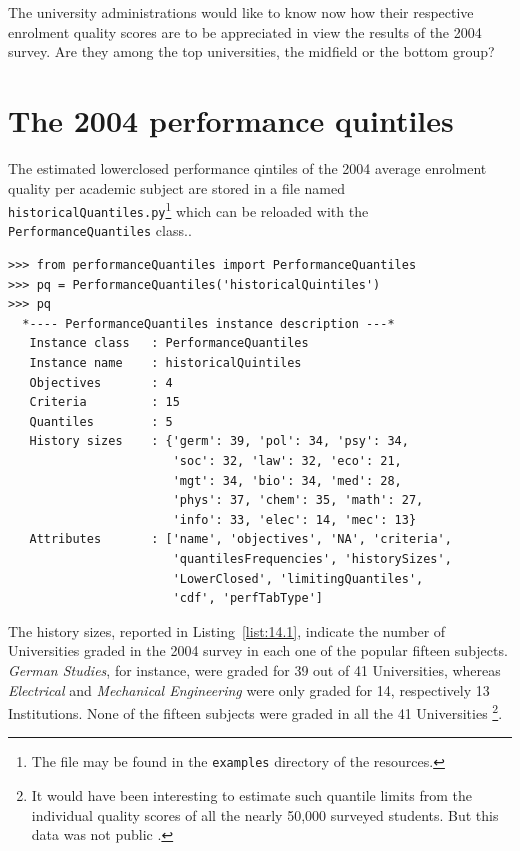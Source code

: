 The university administrations would like to know now how their respective enrolment quality scores are to be appreciated in view the results of the 2004 \Spiegel survey. Are they among the top universities, the midfield or the bottom group?

\section{The 2004 performance quintiles}
\label{sec:14.2}

The estimated lowerclosed performance qintiles of the 2004 average enrolment quality per academic subject are stored in a file named \texttt{historicalQuan\-tiles.py}\footnote{The file may be found in the \texttt{examples} directory of the \Digraph resources.} which can be reloaded with the \texttt{PerformanceQuantiles} class..
\begin{lstlisting}[caption={Inspecting stored historical performance quantiles},label=list:14.1]
>>> from performanceQuantiles import PerformanceQuantiles
>>> pq = PerformanceQuantiles('historicalQuintiles')
>>> pq
  *---- PerformanceQuantiles instance description ---*
   Instance class   : PerformanceQuantiles
   Instance name    : historicalQuintiles
   Objectives       : 4
   Criteria         : 15
   Quantiles        : 5
   History sizes    : {'germ': 39, 'pol': 34, 'psy': 34,
                       'soc': 32, 'law': 32, 'eco': 21,
                       'mgt': 34, 'bio': 34, 'med': 28,
                       'phys': 37, 'chem': 35, 'math': 27,
                       'info': 33, 'elec': 14, 'mec': 13}
   Attributes       : ['name', 'objectives', 'NA', 'criteria',
                       'quantilesFrequencies', 'historySizes',
                       'LowerClosed', 'limitingQuantiles',
                       'cdf', 'perfTabType']
\end{lstlisting}

The history sizes, reported in Listing~\vref{list:14.1}, indicate the number of Universities graded in the 2004 survey in each one of the popular fifteen subjects. \emph{German Studies}, for instance, were graded for 39 out of 41 Universities, whereas \emph{Electrical} and \emph{Mechanical Engineering} were only graded for 14, respectively 13 Institutions. None of the fifteen subjects were graded in all the 41 Universities \footnote{It would have been interesting to estimate such quantile limits from the individual quality scores of all the nearly 50,000 surveyed students. But this data was not public \citep{SPI-2004}.}.                      

